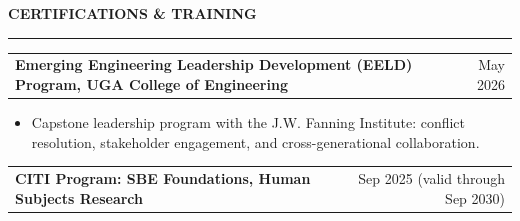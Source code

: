 \documentclass[letterpaper,10pt]{article}
\makeatletter
\newcommand{\SectionGapBefore}{12pt}
\newcommand{\SectionGapAfter}{4pt}
\newcommand{\sectiontitle}[1]{%
  \Needspace*{5\baselineskip}%
  \vspace{\SectionGapBefore}%
  {\textbf{\large #1}}\par
  \vspace{-6pt}%
  \rule{\textwidth}{0.4pt}\par
  \vspace{\SectionGapAfter}%
}
\newcommand{\awardrow}[2]{%
  \Needspace*{3\baselineskip}%
  \begin{tabularx}{\textwidth}{@{}X r@{}}
    \textbf{#1} & #2 \\
  \end{tabularx}\par
  \vspace{1pt}%
}
\makeatother
\begin{document}

\sectiontitle{CERTIFICATIONS \& TRAINING}
\awardrow{Emerging Engineering Leadership Development (EELD) Program, UGA College of Engineering}{May 2026}
\begin{itemize}
\item Capstone leadership program with the J.W. Fanning Institute: conflict resolution, stakeholder engagement, and cross-generational collaboration.
\end{itemize}
\awardrow{CITI Program: SBE Foundations, Human Subjects Research}{Sep 2025 (valid through Sep 2030)}
\end{document}
